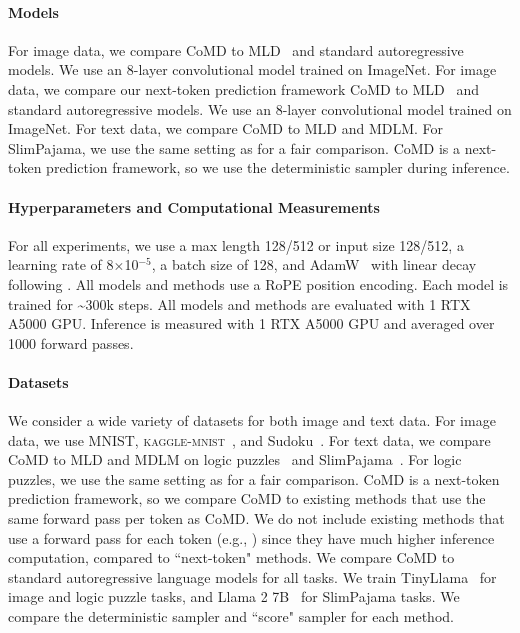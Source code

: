 \documentclass{article} %
\begin{document}
\paragraph{Models} For image data, we compare CoMD to MLD~\citep{austin2023structured} and standard autoregressive models. We use an 8-layer convolutional model trained on ImageNet. For image data, we compare our next-token prediction framework CoMD to MLD~\citep{austin2023structured} and standard autoregressive models. We use an 8-layer convolutional model trained on ImageNet. For text data, we compare CoMD to MLD and MDLM. For SlimPajama, we use the same setting as \citet{nie2024scaling} for a fair comparison. CoMD is a next-token prediction framework, so we use the deterministic sampler during inference. 

\paragraph{Hyperparameters and Computational Measurements}
For all experiments, we use a max length 128/512 or input size 128/512, a learning rate of 8$\times$10$^{-5}$, a batch size of 128, and AdamW~\citep{loshchilov2019decoupled} with linear decay following \citet{austin2023structured}. All models and methods use a RoPE position encoding. Each model is trained for \textasciitilde300k steps. All models and methods are evaluated with 1 RTX A5000 GPU. Inference is measured with 1 RTX A5000 GPU and averaged over 1000 forward passes. 

\paragraph{Datasets}
We consider a wide variety of datasets for both image and text data. For image data, we use MNIST, \textsc{kaggle-mnist}~\citep{david_g__radcliffe_2020}, and Sudoku~\citep{coja2020replica}. For text data, we compare CoMD to MLD and MDLM on logic puzzles~\citep{kitouni2024factorization} and SlimPajama~\citep{soboleva2023slimpajama}. For logic puzzles, we use the same setting as \citet{kitouni2024factorization} for a fair comparison. CoMD is a next-token prediction framework, so we compare CoMD to existing methods that use the same forward pass per token as CoMD. We do not include existing methods that use a forward pass for each token (e.g., \citet{liao-etal-2020-probabilistically}) since they have much higher inference computation, compared to ``next-token" methods. We compare CoMD to standard autoregressive language models for all tasks. We train TinyLlama~\citep{zhang2024tinyllama} for image and logic puzzle tasks, and Llama 2 7B~\citep{touvron2023llama2} for SlimPajama tasks. We compare the deterministic sampler and ``score" sampler for each method.
\end{document}
